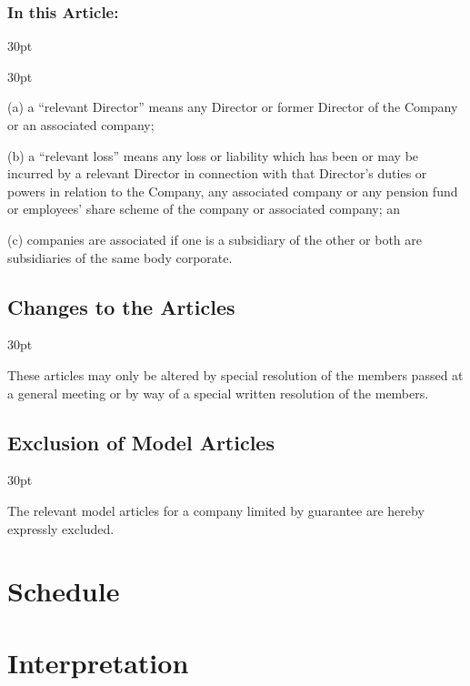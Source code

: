 \documentclass[12pt]{article}
\def\clauseindent{30pt}
\newenvironment{subindentpara}{\raggedright\begin{adjustwidth}{\clauseindent}{}\begin{hanginglist}}{\end{hanginglist}\end{adjustwidth}}
\newenvironment{subindentlist}{\raggedright\begin{adjustwidth}{\clauseindent}{}\begin{labeledlist}{\clauseindent}}{\end{labeledlist}\end{adjustwidth}}
\begin{document}
\subsubsection[Specifics of Purchase and Maintenance of Insurance]{In this Article:}
\begin{subindentlist}
    \item [(a)] a ``relevant Director'' means any Director or former Director of the Company or an associated company;
    \item [(b)] a ``relevant loss'' means any loss or liability which has been or may be incurred by a relevant Director in connection with that Director's duties or powers in relation to the Company, any associated company or any pension fund or employees' share scheme of the company or associated company; an
    \item [(c)] companies are associated if one is a subsidiary of the other or both are subsidiaries of the same body corporate.
\end{subindentlist}

\subsection{Changes to the Articles}
\begin{subindentpara}
    \item These articles may only be altered by special resolution of the members passed at a general meeting or by way of a special written resolution of the members.
\end{subindentpara}

\subsection{Exclusion of Model Articles}
\begin{subindentpara}
    \item The relevant model articles for a company limited by guarantee are hereby expressly excluded.
\end{subindentpara}

\setcounter{section}{0}
\setcounter{subsection}{0}
\setcounter{subsubsection}{0}

\newpage\section*{\huge{Schedule}}
\section*{\huge{Interpretation}}
\end{document}
